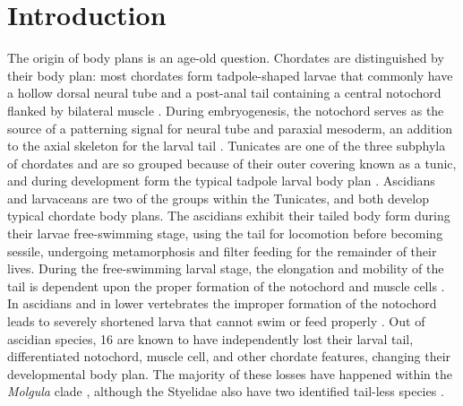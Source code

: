 \chapter{Introduction}
The origin of body plans is an age-old question. Chordates are distinguished by their body plan: most chordates form tadpole-shaped larvae that commonly have a hollow dorsal neural tube and a post-anal tail containing a central notochord flanked by bilateral muscle \cite{nishida_cell_2014}. During embryogenesis, the notochord serves as the source of a patterning signal for neural tube and paraxial mesoderm, an addition to the axial skeleton for the larval tail \cite{jeffery_evolution_1999,stemple_structure_2005}. Tunicates are one of the three subphyla of chordates and are so grouped because of their outer covering known as a tunic, and during development form the typical tadpole larval body plan \cite{huber_evolution_2000}. Ascidians and larvaceans are two of the groups within the Tunicates, and both develop typical chordate body plans. The ascidians exhibit their tailed body form during their larvae free-swimming stage, using the tail for locomotion  before becoming sessile, undergoing metamorphosis and filter feeding for the remainder of their lives. During the free-swimming larval stage, the elongation and mobility of the tail is dependent upon the proper formation of the notochord and muscle cells \cite{satoh_ascidian_2003}. In ascidians and in lower vertebrates the improper formation of the notochord leads to severely shortened larva that cannot swim or feed properly \cite{di_gregorio_tail_2002,jiang_ascidian_2005,stemple_structure_2005}. Out of   ascidian species, 16 are known to have independently lost their larval tail, differentiated notochord, muscle cell, and other chordate features, changing their developmental body plan. The majority of these losses have happened within the \textit{Molgula} clade \cite{berrill_studies_1931,swalla_interspecific_1990}, although the Styelidae also have two identified tail-less species \cite{huber_evolution_2000}.

